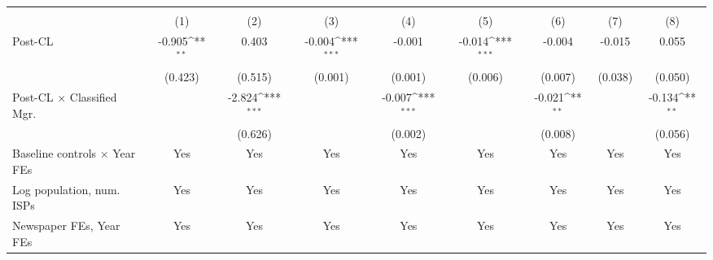 {
\def\sym#1{\ifmmode^{#1}\else\(^{#1}\)\fi}
\begin{tabular}{l*{8}{c}}
\toprule
                    &&&&\\\cmidrule(lr){2-3}\cmidrule(lr){4-5}\cmidrule(lr){6-7}\cmidrule(lr){8-9}
                    &         &         &         &         &         &         &         &         \\
\midrule
Post-CL             &      -0.905\sym{**} &       0.403         &      -0.004\sym{***}&      -0.001         &      -0.014\sym{***}&      -0.004         &      -0.015         &       0.055         \\
                    &     (0.423)         &     (0.515)         &     (0.001)         &     (0.001)         &     (0.006)         &     (0.007)         &     (0.038)         &     (0.050)         \\
\addlinespace
Post-CL $\times$ Classified Mgr.&                     &      -2.824\sym{***}&                     &      -0.007\sym{***}&                     &      -0.021\sym{**} &                     &      -0.134\sym{**} \\
                    &                     &     (0.626)         &                     &     (0.002)         &                     &     (0.008)         &                     &     (0.056)         \\
\addlinespace
Baseline controls $\times$ Year FEs &         Yes         &         Yes         &         Yes         &         Yes         &         Yes         &         Yes         &         Yes         &         Yes         \\
\addlinespace
Log population, num. ISPs &         Yes         &         Yes         &         Yes         &         Yes         &         Yes         &         Yes         &         Yes         &         Yes         \\
\addlinespace
Newspaper FEs, Year FEs &         Yes         &         Yes         &         Yes         &         Yes         &         Yes         &         Yes         &         Yes         &         Yes         \\

\end{tabular}}
